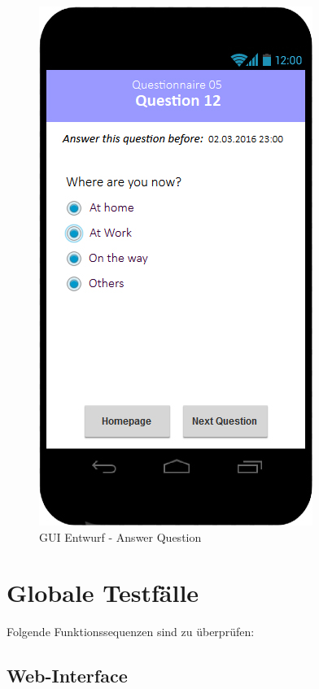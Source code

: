 \documentclass[a4paper]{scrreprt}
\begin{document}
            \vspace*{1cm}
            \begin{figure}[ht]
                \centering
                \includegraphics[scale = 0.3]{android_answer.jpg}
                \caption{GUI Entwurf - Answer Question}
            \end{figure}	

    \chapter{Globale Testfälle}

        Folgende Funktionssequenzen sind zu \"uberpr\"ufen:

        \section{Web-Interface}
\end{document}
